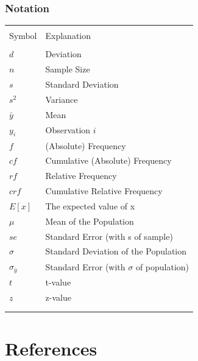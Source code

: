 \documentclass[12pt,a4paper]{article}
\makeatletter
\renewenvironment{table}[1][]{%
 \ifthenelse{\equal{#1}{}}{%
   \@float{table}
 }{%
   \@float{table}[#1]%
 }%
 \centering
}{%
 \end@float
}
\newcommand\T{\specialrule{.08em}{.05em}{.17em}\hline} %
\newcommand\B{\hline\specialrule{.08em}{.17em}{.05em}} %
\makeatother
\begin{document}
\newpage

\section{Notation}\label{sec:Notation}

\begin{table}[!h]
\centering
\begin{tabularx}{\textwidth}{lX}
  \T
            &  \\[-1.5ex]
        Symbol  &   Explanation \\ \hline
        &  \\[-1ex]
$d$ &   Deviation   \\[0.35ex]
$n$ &   Sample Size \\[0.35ex]
$s$ &   Standard Deviation  \\[0.35ex]
$s^{2}$ &   Variance    \\[0.35ex]
$\bar{y}$   &   Mean    \\[0.35ex]
$y_{i}$ &   Observation $i$ \\[0.35ex]
$f$ &   (Absolute) Frequency    \\[0.35ex]
$cf$    &   Cumulative (Absolute) Frequency \\[0.35ex]
$rf$    &   Relative Frequency  \\[0.35ex]
$crf$   &   Cumulative Relative Frequency \\[0.35ex]
$E[x]$  &   The expected value of x \\[0.35ex]
$\mu$   &   Mean of the Population  \\[0.35ex]
$se$    &   Standard Error (with s of sample)   \\[0.35ex]
$\sigma$    &   Standard Deviation of the Population    \\[0.35ex]
$\sigma_{\bar{y}}$ &    Standard Error (with $\sigma$ of population) \\[0.35ex]
$t$     &   t-value \\[0.35ex]
$z$     &   z-value \\
        &  \\[-1.6ex]
        \B
    \end{tabularx}
    \caption{Notation}
    \label{tbl:notation}
\end{table}

\newpage

\part{References}



\printbibliography[title=List of References]
\end{document}
